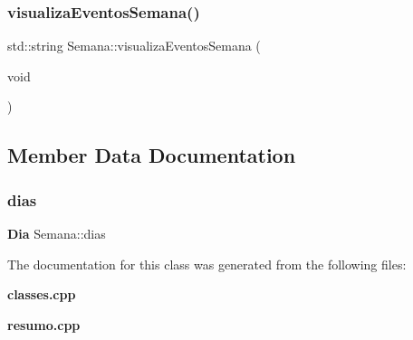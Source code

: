 \subsubsection{visualiza\+Eventos\+Semana()}
{\footnotesize\ttfamily std\+::string Semana\+::visualiza\+Eventos\+Semana (\begin{DoxyParamCaption}\item[{void}]{ }\end{DoxyParamCaption})\hspace{0.3cm}{\ttfamily [inline]}}



\subsection{Member Data Documentation}
\mbox{\label{class_semana_a015cbf722c910370fc14ed8a21b939cb}} 
\subsubsection{dias}
{\footnotesize\ttfamily \textbf{ Dia} Semana\+::dias}



The documentation for this class was generated from the following files\+:\begin{DoxyCompactItemize}
\item 
\textbf{ classes.\+cpp}\item 
\textbf{ resumo.\+cpp}\end{DoxyCompactItemize}
